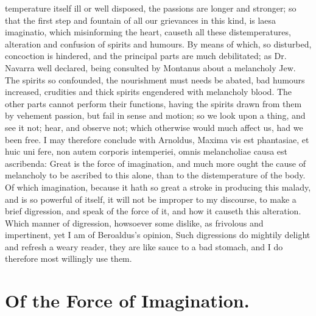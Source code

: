 {temperature itself ill or well disposed, the passions are longer and
stronger; so that the first step and fountain of all our grievances in
this kind, is laesa imaginatio, which misinforming the heart,
causeth all these distemperatures, alteration and confusion of spirits
and humours. By means of which, so disturbed, concoction is hindered,
and the principal parts are much debilitated; as Dr. Navarra well
declared, being consulted by Montanus about a melancholy Jew. The
spirits so confounded, the nourishment must needs be abated, bad
humours increased, crudities and thick spirits engendered with
melancholy blood. The other parts cannot perform their functions,
having the spirits drawn from them by vehement passion, but fail in
sense and motion; so we look upon a thing, and see it not; hear, and
observe not; which otherwise would much affect us, had we been free. I
may therefore conclude with Arnoldus, Maxima vis est phantasiae,
et huic uni fere, non autem corporis intemperiei, omnis melancholiae
causa est ascribenda: Great is the force of imagination, and much more
ought the cause of melancholy to be ascribed to this alone, than to the
distemperature of the body. Of which imagination, because it hath so
great a stroke in producing this malady, and is so powerful of itself,
it will not be improper to my discourse, to make a brief digression,
and speak of the force of it, and how it causeth this alteration. Which
manner of digression, howsoever some dislike, as frivolous and
impertinent, yet I am of Beroaldus's opinion, Such digressions do
mightily delight and refresh a weary reader, they are like sauce to a
bad stomach, and I do therefore most willingly use them.

\section{Of the Force of Imagination.}

}
